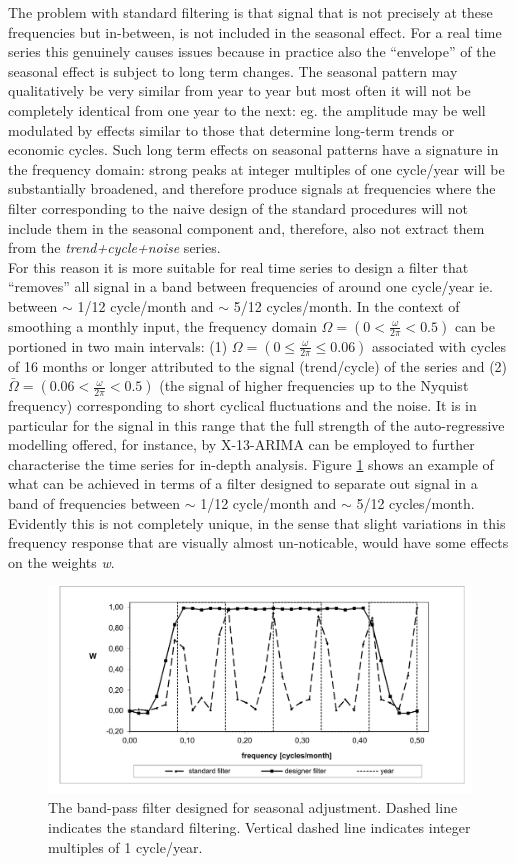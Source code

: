 \documentclass[english,blauw]{cbsdiscussionpaper}
\begin{document}
The problem with standard filtering is that signal that is not precisely at these frequencies but in-between, is not included in the seasonal effect. For a real time series this genuinely causes issues because in practice also the ``envelope'' of the seasonal effect is subject to long term changes. The seasonal pattern may qualitatively be very similar from year to year but most often it will not be completely identical from one year to the next: eg. the amplitude may be well modulated by effects similar to those that determine long-term trends or economic cycles. Such long term effects on seasonal patterns have a signature in the frequency domain: strong peaks at integer multiples of one cycle/year will be substantially broadened, and therefore produce signals at frequencies where the filter corresponding to the naive design of the standard procedures will not include them in the seasonal component and, therefore, also not extract them from the \textit{trend+cycle+noise} series.\\For this reason it is more suitable for real time series to design a filter that ``removes'' all signal in a band between frequencies of around one cycle/year ie. between $\sim$ 1/12 cycle/month and $\sim$ 5/12 cycles/month. In the context of smoothing a monthly input, the frequency domain $\Omega=(0<\frac {\omega}{2\pi}<0.5)$ can be portioned in two main intervals: (1) $\Omega=(0 \leq \frac {\omega}{2\pi} \leq 0.06)$ associated with cycles of 16 months or longer attributed to the signal (trend/cycle) of the series and (2) $\bar{\Omega}=(0.06 < \frac {\omega}{2\pi} < 0.5)$ (the signal of higher frequencies up to the Nyquist frequency) corresponding to short cyclical fluctuations and the noise. It is in particular for the signal in this range that the full strength of the auto-regressive modelling offered, for instance, by X-13-ARIMA can be employed to further characterise the time series for in-depth analysis. Figure \ref{fig:filters} shows an example of what can be achieved in terms of a filter designed to separate out signal in a band of frequencies between $\sim$ 1/12 cycle/month and $\sim$ 5/12 cycles/month. Evidently this is not completely unique, in the sense that slight variations in this frequency response that are visually almost un-noticable, would have some effects on the weights \textit{w}.
\begin{figure}[h]
 \includegraphics[width=\linewidth]{../images/capitolo2/filters.pdf}
 \caption{The band-pass filter designed for seasonal adjustment. Dashed line indicates the standard filtering. Vertical dashed line indicates integer multiples of 1 cycle/year.}
 \label{fig:filters}
\end{figure}
\end{document}
